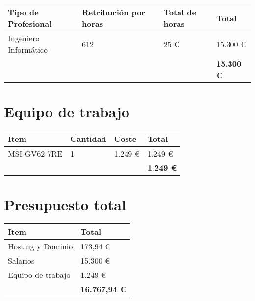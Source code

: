 \begin{table}[h]
	\centering
	\begin{tabular}{| p{5cm} | p{2cm} | p{1.6cm} | p{2.3cm} |}
		\rowcolor[HTML]{329A9D} 
		{\color[HTML]{FFFFFF} \textbf{Tipo de Profesional}} & {\color[HTML]{FFFFFF} \textbf{Retribución por horas}} & {\color[HTML]{FFFFFF} \textbf{Total de horas}} & {\color[HTML]{FFFFFF} \textbf{Total}} \\ \hline
		Ingeniero Informático & 612 & 25 \euro & 15.300 \euro \\ \hline
		&  & & \textbf{15.300 \euro }\\ \hline
	\end{tabular}
\end{table}

\section{Equipo de trabajo}

\begin{table}[h]
	\centering
	\begin{tabular}{| p{5cm} | p{2cm} | p{1.6cm} | p{2.3cm} |}
		\rowcolor[HTML]{329A9D} 
		{\color[HTML]{FFFFFF} \textbf{Item}} & {\color[HTML]{FFFFFF} \textbf{Cantidad}} & {\color[HTML]{FFFFFF} \textbf{Coste}} & {\color[HTML]{FFFFFF} \textbf{Total}} \\ \hline
		MSI GV62 7RE & 1 & 1.249 \euro & 1.249 \euro \\ \hline
		&  & & \textbf{1.249 \euro }\\ \hline
	\end{tabular}
\end{table}

\section{Presupuesto total}

\begin{table}[h]
	\centering
	\begin{tabular}{| p{8.6cm} | p{2.3cm} |}
		\rowcolor[HTML]{329A9D} 
		{\color[HTML]{FFFFFF} \textbf{Item}} & {\color[HTML]{FFFFFF} \textbf{Total}} \\ \hline
		Hosting y Dominio & 173,94 \euro \\ \hline
		Salarios & 15.300 \euro \\ \hline
		Equipo de trabajo & 1.249 \euro \\ \hline
		& \textbf{16.767,94 \euro }\\ \hline
	\end{tabular}
\end{table}
